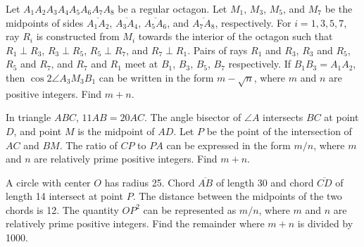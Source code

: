 %	







\begin{question}[name={2011 AIME I, \href{https://artofproblemsolving.com/community/c4p2209774}{Problem 14}}]
	Let $A_1 A_2 A_3 A_4 A_5 A_6 A_7 A_8$ be a regular octagon. Let $M_1$, $M_3$, $M_5$, and $M_7$ be the midpoints of sides $\overline{A_1 A_2}$, $\overline{A_3 A_4}$, $\overline{A_5 A_6}$, and $\overline{A_7 A_8}$, respectively. For $i = 1, 3, 5, 7$, ray $R_i$ is constructed from $M_i$ towards the interior of the octagon such that $R_1 \perp R_3$, $R_3 \perp R_5$, $R_5 \perp R_7$, and $R_7 \perp R_1$. Pairs of rays $R_1$ and $R_3$, $R_3$ and $R_5$, $R_5$ and $R_7$, and $R_7$ and $R_1$ meet at $B_1$, $B_3$, $B_5$, $B_7$ respectively. If $B_1 B_3 = A_1 A_2$, then $\cos 2 \angle A_3 M_3 B_1$ can be written in the form $m - \sqrt{n}$, where $m$ and $n$ are positive integers. Find $m + n$.
\end{question}


%	









\begin{question}[name={2011 AIME II, \href{https://artofproblemsolving.com/community/c4p2224401}{Problem 4}}]
	In triangle $ABC$, $11 AB={20} AC$. The angle bisector of $\angle A$ intersects $BC$ at point $D$, and point $M$ is the midpoint of $AD$. Let $P$ be the point of the intersection of $AC$ and $BM$. The ratio of $CP$ to $PA$ can be expressed in the form ${m}/{n}$, where $m$ and $n$ are relatively prime positive integers. Find $m+n$.
\end{question}


%	












\begin{question}[name={2011 AIME II, \href{https://artofproblemsolving.com/community/c4p2224407}{Problem 10}}]
	A circle with center $O$ has radius 25. Chord $\overline{AB}$ of length 30 and chord $\overline{CD}$ of length 14 intersect at point $P$. The distance between the midpoints of the two chords is 12. The quantity $OP^2$ can be represented as ${m}/{n}$, where $m$ and $n$ are relatively prime positive integers. Find the remainder where $m+n$ is divided by 1000.	
	
\end{question}



